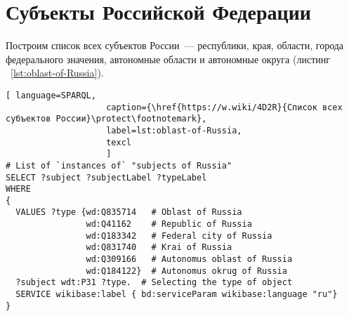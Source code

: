 
\section{Субъекты Российской Федерации}

Построим список всех субъектов России~--- республики, края, области, города федерального значения, автономные области и автономные округа (листинг ~\protect\ref{lst:oblast-of-Russia}).


\begin{lstlisting}[ language=SPARQL, 
                    caption={\href{https://w.wiki/4D2R}{Список всех субъектов России}\protect\footnotemark},
                    label=lst:oblast-of-Russia,
                    texcl 
                    ]
# List of `instances of` "subjects of Russia" 
SELECT ?subject ?subjectLabel ?typeLabel
WHERE
{  
  VALUES ?type {wd:Q835714   # Oblast of Russia
                wd:Q41162    # Republic of Russia
                wd:Q183342   # Federal city of Russia
                wd:Q831740   # Krai of Russia
                wd:Q309166   # Autonomus oblast of Russia
                wd:Q184122}  # Autonomus okrug of Russia
  ?subject wdt:P31 ?type.  # Selecting the type of object
  SERVICE wikibase:label { bd:serviceParam wikibase:language "ru"}
}
\end{lstlisting}%


